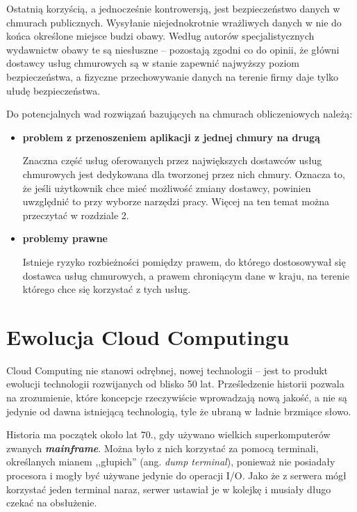 \documentclass[12pt,a4paper,twoside,titlepage,openright]{book}
\begin{document}
Ostatnią korzyścią, a jednocześnie kontrowersją, jest bezpieczeństwo danych w chmurach publicznych. Wysyłanie niejednokrotnie wrażliwych danych w nie do końca określone miejsce budzi obawy. Według autorów specjalistycznych wydawnictw\cite{ccCambridge,ccBiznes} obawy te są niesłuszne -- pozostają zgodni co do opinii, że główni dostawcy usług chmurowych są w stanie zapewnić najwyższy poziom bezpieczeństwa, a fizyczne przechowywanie danych na terenie firmy daje tylko ułudę bezpieczeństwa.

Do potencjalnych wad rozwiązań bazujących na chmurach obliczeniowych należą:

\begin{itemize}

\item \textbf{problem z przenoszeniem aplikacji z jednej chmury na drugą}

Znaczna część usług oferowanych przez największych dostawców usług chmurowych jest dedykowana dla tworzonej przez nich chmury. Oznacza to, że jeśli użytkownik chce mieć możliwość zmiany dostawcy, powinien uwzględnić to przy wyborze narzędzi pracy. Więcej na ten temat można przeczytać w rozdziale 2.

\item \textbf{problemy prawne}

Istnieje ryzyko rozbieżności pomiędzy prawem, do którego dostosowywał się dostawca usług chmurowych, a prawem chroniącym dane w kraju, na terenie którego chce się korzystać z tych usług. 

\end{itemize}


\section{Ewolucja Cloud Computingu}

Cloud Computing nie stanowi odrębnej, nowej technologii -- jest to produkt ewolucji technologii rozwijanych od blisko 50 lat. Prześledzenie historii pozwala na zrozumienie, które koncepcje rzeczywiście wprowadzają nową jakość, a nie są jedynie od dawna istniejącą technologią, tyle że  ubraną w ładnie brzmiące słowo.


Historia ma początek około lat 70., gdy używano wielkich superkomputerów zwanych \textbf{\textit{mainframe}}. Można było z nich korzystać za pomocą terminali, określanych mianem ,,głupich'' (ang. \textit{dump terminal}), ponieważ nie posiadały procesora i mogły być używane jedynie do operacji I/O. Jako że z serwera mógł korzystać jeden terminal naraz, serwer ustawiał je w kolejkę i musiały długo czekać na obsłużenie.
\end{document}
